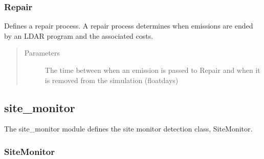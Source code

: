 \documentclass[letterpaper,10pt,english]{sphinxmanual}
\begin{document}
\subsubsection{Repair}
\label{\detokenize{index:id1}}

\begin{fulllineitems}
\label{\detokenize{index:feast.DetectionModules.repair.Repair}}
Defines a repair process. A repair process determines when emissions are ended by an LDAR program and the
associated costs.
\begin{quote}\begin{description}
\item[{Parameters}] \leavevmode
{} \textendash{} The time between when an emission is passed to Repair and when it is removed from the
simulation (float\textendash{}days)

\end{description}\end{quote}

\end{fulllineitems}



\subsection{site\_monitor}
\label{\detokenize{index:module-feast.DetectionModules.site_monitor}}\label{\detokenize{index:site-monitor}}
The site\_monitor module defines the site monitor detection class, SiteMonitor.


\subsubsection{SiteMonitor}
\label{\detokenize{index:sitemonitor}}
\end{document}
